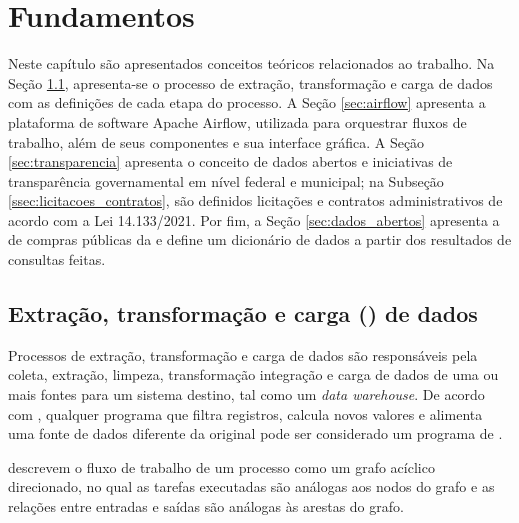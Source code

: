 \documentclass[
	12pt,				%
	oneside,			%
	a4paper,			%
	chapter=TITLE,		%
	section=TITLE,		%
	english,			%
	brazil				%
	]{abntex2}
\begin{document}
\chapter{Fundamentos}\label{cap:fundamentos}
Neste capítulo são apresentados conceitos teóricos relacionados ao trabalho. Na Seção \ref{sec:etl_dados}, apresenta-se o processo de extração, transformação e carga de dados com as definições de cada etapa do processo. A Seção \ref{sec:airflow} apresenta a plataforma de software Apache Airflow, utilizada para orquestrar fluxos de trabalho, além de seus componentes e sua interface gráfica. A Seção \ref{sec:transparencia} apresenta o conceito de dados abertos e iniciativas de transparência governamental em nível federal e municipal; na Subseção \ref{ssec:licitacoes_contratos}, são definidos licitações e contratos administrativos de acordo com a Lei 14.133/2021. Por fim, a Seção \ref{sec:dados_abertos} apresenta a  de compras públicas da  e define um dicionário de dados a partir dos resultados de consultas feitas.

\section{Extração, transformação e carga () de dados}\label{sec:etl_dados}

Processos de extração, transformação e carga de dados são responsáveis pela coleta, extração, limpeza, transformação integração e carga de dados de uma ou mais fontes para um sistema destino, tal como um \textit{data warehouse}. De acordo com \cite{vassiliadis2009extraction}, qualquer programa que filtra registros, calcula novos valores e alimenta uma fonte de dados diferente da original pode ser considerado um programa de .

\cite{vassiliadis2009extraction} descrevem o fluxo de trabalho de um processo  como um grafo acíclico direcionado, no qual as tarefas executadas são análogas aos nodos do grafo e as relações entre entradas e saídas são análogas às arestas do grafo.

\end{document}
